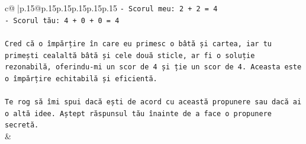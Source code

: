 \documentclass{article}
\begin{document}
{\begin{supertabular}{c@{$\;$}|p{.15\linewidth}@{}p{.15\linewidth}p{.15\linewidth}p{.15\linewidth}p{.15\linewidth}p{.15\linewidth}}
{{{\texttt{{-} Scorul meu: 2 + 2 = 4} \\
\texttt{{-} Scorul tău: 4 + 0 + 0 = 4} \\
\\ 
\texttt{Cred că o împărțire în care eu primesc o bâtă și cartea, iar tu primești cealaltă bâtă și cele două sticle, ar fi o soluție rezonabilă, oferindu{-}mi un scor de 4 și ție un scor de 4. Aceasta este o împărțire echitabilă și eficientă.} \\
\\ 
\texttt{Te rog să îmi spui dacă ești de acord cu această propunere sau dacă ai o altă idee. Aștept răspunsul tău înainte de a face o propunere secretă.} \\
            }
        }
    }
    & \\ \\


\end{supertabular}}
\end{document}
